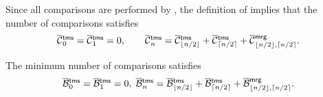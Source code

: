 
Since all comparisons are performed by
, the definition of
 implies that the number of
comparisons satisfies
\begin{equation}
\OC{\fun{tms}}{0} = \OC{\fun{tms}}{1} = 0,
\qquad
\OC{\fun{tms}}{n} = \OC{\fun{tms}}{\floor{n/2}}
+ \OC{\fun{tms}}{\ceiling{n/2}}
+ \OC{\fun{mrg}}{\floor{n/2},\ceiling{n/2}}.
\index{tms@$\OC{\fun{tms}}{n}$}
\label{eq:cost_tms}
\end{equation}


The minimum number of comparisons satisfies
\begin{equation*}
\OB{\fun{tms}}{0} = \OB{\fun{tms}}{1} = 0,
\;
\OB{\fun{tms}}{n} = \OB{\fun{tms}}{\floor{n/2}}
+ \OB{\fun{tms}}{\ceiling{n/2}}
+ \OB{\fun{mrg}}{\floor{n/2},\ceiling{n/2}}.
\index{mrg@\fun{mrg/2}}
\index{tms@$\OB{\fun{tms}}{n}$}
\end{equation*}
%

